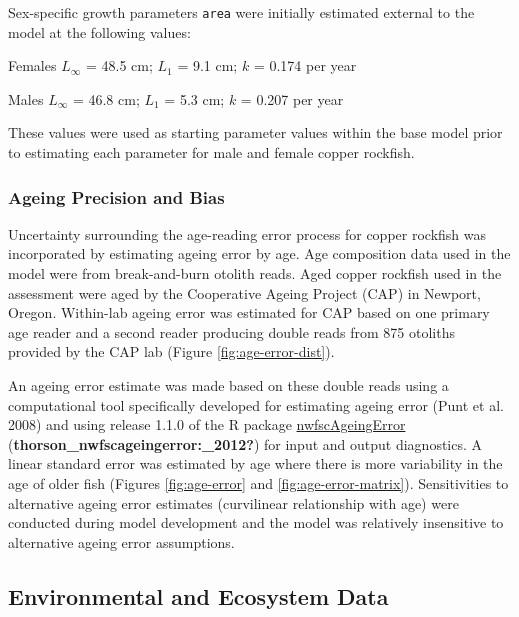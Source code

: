 \documentclass[11pt,
  english,
  letterpaper,
]{article}
\begin{document}
Sex-specific growth parameters \texttt{area} were initially estimated external to the model at the following values:

\begin{centering}

Females $L_{\infty}$ = 48.5 cm; $L_1$ = 9.1 cm; $k$ = 0.174 per year

Males $L_{\infty}$ = 46.8 cm; $L_1$ = 5.3 cm; $k$ = 0.207 per year

\end{centering}

\vspace{0.50cm}

These values were used as starting parameter values within the base model prior to estimating each parameter for male and female copper rockfish.

\hypertarget{ageing-precision-and-bias}{%
\subsubsection{Ageing Precision and Bias}\label{ageing-precision-and-bias}}

Uncertainty surrounding the age-reading error process for copper rockfish was incorporated by estimating ageing error by age. Age composition data used in the model were from break-and-burn otolith reads. Aged copper rockfish used in the assessment were aged by the Cooperative Ageing Project (CAP) in Newport, Oregon. Within-lab ageing error was estimated for CAP based on one primary age reader and a second reader producing double reads from 875 otoliths provided by the CAP lab (Figure \ref{fig:age-error-dist}).

An ageing error estimate was made based on these double reads using a computational tool specifically developed for estimating ageing error (Punt et al. 2008) and using release 1.1.0 of the R package \href{https://github.com/nwfsc-assess/nwfscAgeingError}{nwfscAgeingError} (\textbf{thorson\_nwfscageingerror:\_2012?}) for input and output diagnostics. A linear standard error was estimated by age where there is more variability in the age of older fish (Figures \ref{fig:age-error} and \ref{fig:age-error-matrix}). Sensitivities to alternative ageing error estimates (curvilinear relationship with age) were conducted during model development and the model was relatively insensitive to alternative ageing error assumptions.

\hypertarget{environmental-and-ecosystem-data}{%
\subsection{Environmental and Ecosystem Data}\label{environmental-and-ecosystem-data}}
\end{document}
